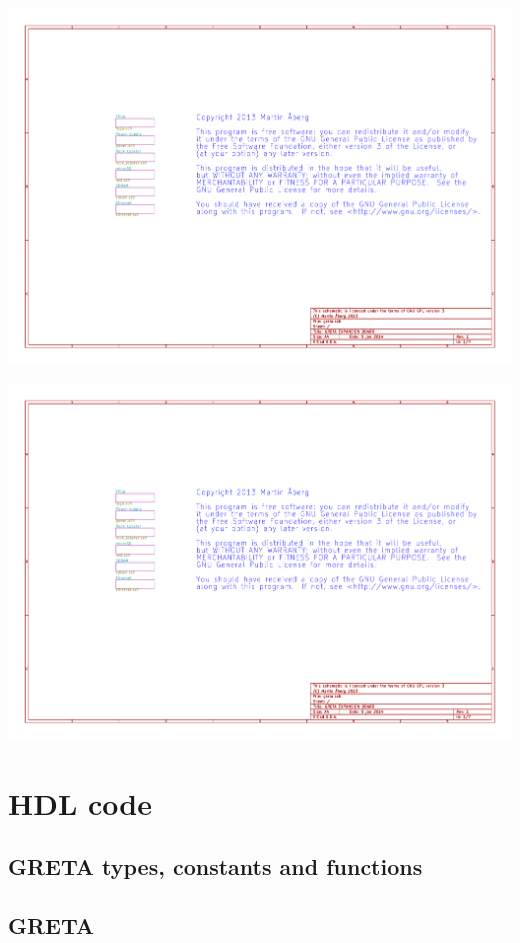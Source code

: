 \documentclass[a4paper]{report}
\begin{document}
\begin{centering}
\includegraphics[width=\textwidth, page=4]{schematic.pdf}

\includegraphics[width=\textwidth, page=7]{schematic.pdf}
\end{centering}

\chapter{HDL code}
\label{hdl_code}

\section{GRETA types, constants and functions}
    

\newpage
\section{GRETA}
    
\end{document}
